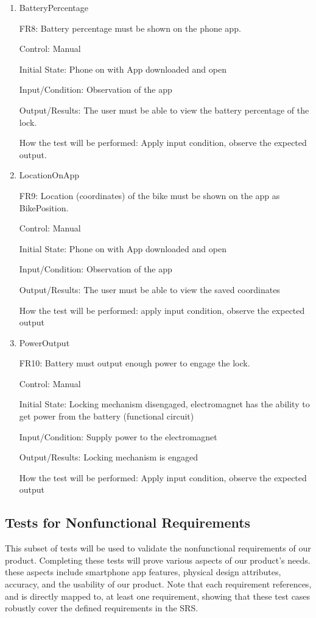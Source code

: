 \documentclass[12pt, titlepage]{article}
\begin{document}
\begin{enumerate}

\item{BatteryPercentage

FR8: Battery percentage must be shown on the phone app. }

Control: Manual 

Initial State: Phone on with App downloaded and open 

Input/Condition: Observation of the app

Output/Results: The user must be able to view the battery percentage of the lock.

How the test will be performed: Apply input condition, observe the expected output.

\item{LocationOnApp

FR9: Location (coordinates) of the bike must be shown on the app as BikePosition.}

Control: Manual 

Initial State: Phone on with App downloaded and open 

Input/Condition: Observation of the app 

Output/Results: The user must be able to view the saved coordinates 

How the test will be performed: apply input condition, observe the expected output

\item{PowerOutput

FR10: Battery must output enough power to engage the lock. }

Control: Manual 

Initial State: Locking mechanism disengaged, electromagnet has the ability to get power from the battery (functional circuit) 

Input/Condition: Supply power to the electromagnet 

Output/Results: Locking mechanism is engaged 

How the test will be performed: Apply input condition, observe the expected output

\end{enumerate}

\subsection{Tests for Nonfunctional Requirements}
\label{Section 5.2}

This subset of tests will be used to validate the nonfunctional requirements of our product. Completing these tests will prove various aspects of our product's needs. these aspects include smartphone app features, physical design attributes, accuracy, and the usability of our product. Note that each requirement references, and is directly mapped to, at least one requirement, showing that these test cases robustly cover the defined requirements in the SRS.
\end{document}

